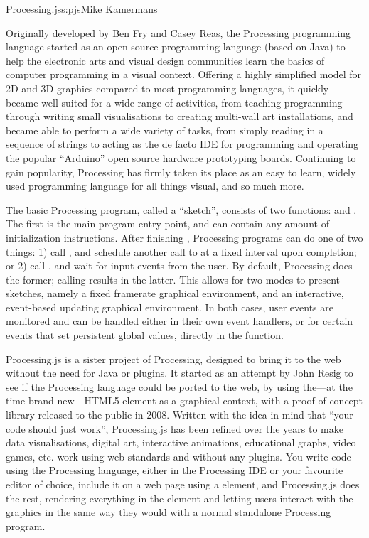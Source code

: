\begin{aosachapter}{Processing.js}{s:pjs}{Mike Kamermans}


Originally developed by Ben Fry and Casey Reas, the Processing
programming language started as an open source programming language
(based on Java) to help the electronic arts and visual design
communities learn the basics of computer programming in a visual
context. Offering a highly simplified model for 2D and 3D graphics
compared to most programming languages, it quickly became well-suited
for a wide range of activities, from teaching programming through
writing small visualisations to creating multi-wall art installations,
and became able to perform a wide variety of tasks, from simply reading in a
sequence of strings to acting as the de facto IDE for programming and
operating the popular ``Arduino'' open source hardware prototyping
boards. Continuing to gain popularity, Processing has firmly taken
its place as an easy to learn, widely used programming language for
all things visual, and so much more.

The basic Processing program, called a ``sketch'', consists of two
functions:  and . The first is the main program
entry point, and can contain any amount of initialization
instructions. After finishing , Processing programs can do
one of two things: 1) call , and
schedule another call to  at a fixed
interval upon completion; or 2) call , and
wait for input events from the user. By default, Processing does the
former; calling  results in the latter. This allows for two modes to
present sketches, namely a fixed framerate graphical environment, and
an interactive, event-based updating graphical environment. In both
cases, user events are monitored and can be handled either in their
own event handlers, or for certain events that set persistent global
values, directly in the  function.

Processing.js is a sister project of Processing, designed to bring
it to the web without the need for Java or plugins. It started as an
attempt by John Resig to see if the Processing language could be
ported to the web, by using the---at the time brand new---HTML5
 element as a graphical context,
with a proof of concept library released to the public in
2008. Written with the idea in mind that ``your code should just
work'', Processing.js has been refined over the years to make 
data visualisations, digital art, interactive animations, educational
graphs, video games, etc. work using web standards and without any
plugins. You write code using the Processing language, either in the
Processing IDE or your favourite editor of choice, include it on a web
page using a  element, and
Processing.js does the rest, rendering everything in the
 element and letting users
interact with the graphics in the same way they would with a normal
standalone Processing program.


\end{aosachapter}
